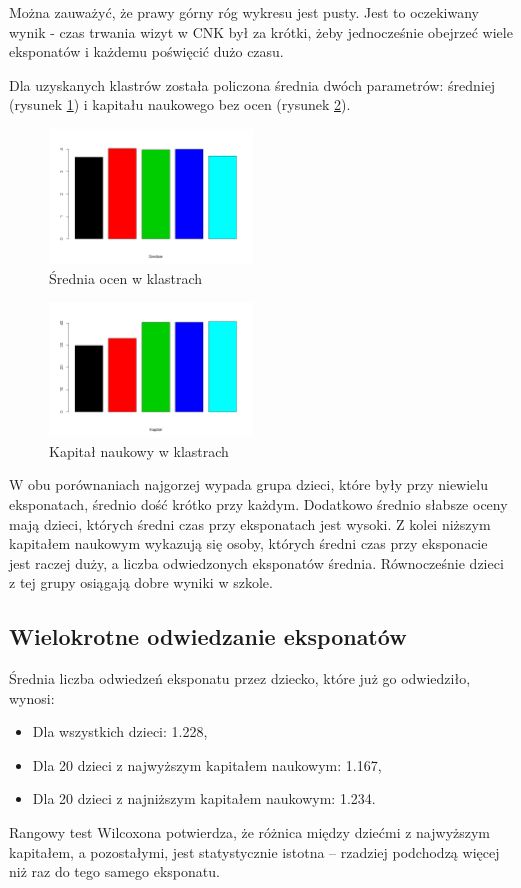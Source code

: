 \documentclass[conference]{IEEEtran}
\begin{document}
Można zauważyć, że prawy górny róg wykresu jest pusty. Jest to oczekiwany wynik - czas trwania wizyt w CNK był za krótki, żeby jednocześnie obejrzeć wiele eksponatów i każdemu poświęcić dużo czasu.

Dla uzyskanych klastrów została policzona średnia dwóch parametrów: średniej (rysunek \ref{srednie_w_klastrach}) i kapitału naukowego bez ocen (rysunek \ref{kapital_w_klastrach}).

\begin{figure}[H]
\includegraphics[width=0.48\textwidth]{srednie_w_klastrach.png}
\caption{Średnia ocen w klastrach}
\label{srednie_w_klastrach}
\end{figure}

\begin{figure}[H]
\includegraphics[width=0.48\textwidth]{kapital_w_klastrach.png}
\caption{Kapitał naukowy w klastrach}
\label{kapital_w_klastrach}
\end{figure}

W obu porównaniach najgorzej wypada grupa dzieci, które były przy niewielu eksponatach, średnio dość krótko przy każdym.
Dodatkowo średnio słabsze oceny mają dzieci, których średni czas przy eksponatach jest wysoki.
Z kolei niższym kapitałem naukowym wykazują się osoby, których średni czas przy eksponacie jest raczej duży, a liczba odwiedzonych eksponatów średnia. Równocześnie dzieci z tej grupy osiągają dobre wyniki w szkole. 

\subsection{Wielokrotne odwiedzanie eksponatów}
Średnia liczba odwiedzeń eksponatu przez dziecko, które już go odwiedziło, wynosi:
\begin{itemize}
\item Dla wszystkich dzieci: 1.228,
\item Dla 20 dzieci z najwyższym kapitałem naukowym: 1.167,
\item Dla 20 dzieci z najniższym kapitałem naukowym: 1.234.
\end{itemize}
Rangowy test Wilcoxona potwierdza, że różnica między dziećmi z najwyższym kapitałem, a pozostałymi, jest statystycznie istotna -- rzadziej podchodzą więcej niż raz do tego samego eksponatu.
\end{document}
